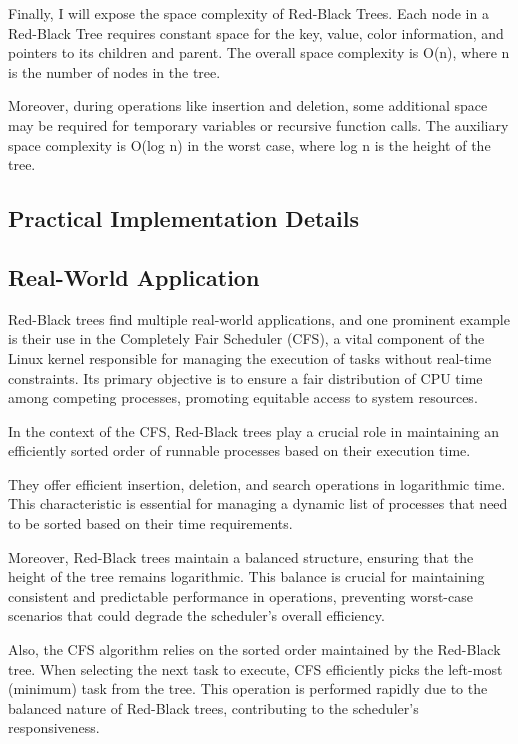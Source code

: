 \documentclass[12pt]{amsart}
\begin{document}
    Finally, I will expose the space complexity of Red-Black Trees.
    Each node in a Red-Black Tree requires constant space for the key, value, color information, and pointers to its children and parent. The overall space complexity is O(n), where n is the number of nodes in the tree.
    
    Moreover, during operations like insertion and deletion, some additional space may be required for temporary variables or recursive function calls.
    The auxiliary space complexity is O(log n) in the worst case, where log n is the height of the tree.

\subsection{Practical Implementation Details}

\subsection{Real-World Application}
   Red-Black trees find multiple real-world applications, and one prominent example is their use in the Completely Fair Scheduler (CFS), a vital component of the Linux kernel responsible for managing the execution of tasks without real-time constraints. Its primary objective is to ensure a fair distribution of CPU time among competing processes, promoting equitable access to system resources.
   
   In the context of the CFS, Red-Black trees play a crucial role in maintaining an efficiently sorted order of runnable processes based on their execution time.
   
   They offer efficient insertion, deletion, and search operations in logarithmic time. This characteristic is essential for managing a dynamic list of processes that need to be sorted based on their time requirements.
   
   Moreover, Red-Black trees maintain a balanced structure, ensuring that the height of the tree remains logarithmic. This balance is crucial for maintaining consistent and predictable performance in operations, preventing worst-case scenarios that could degrade the scheduler's overall efficiency.
   
   Also, the CFS algorithm relies on the sorted order maintained by the Red-Black tree. When selecting the next task to execute, CFS efficiently picks the left-most (minimum) task from the tree. This operation is performed rapidly due to the balanced nature of Red-Black trees, contributing to the scheduler's responsiveness.
   
\end{document}
